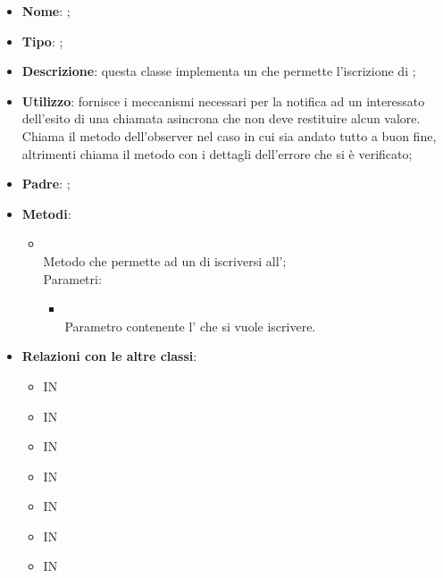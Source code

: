 \begin{itemize}
	\item \textbf{Nome}: ;
	\item \textbf{Tipo}: ;
	\item \textbf{Descrizione}: questa classe implementa un  che permette l'iscrizione di ;
	\item \textbf{Utilizzo}: fornisce i meccanismi necessari per la notifica ad un  interessato dell'esito di una chiamata asincrona che non deve restituire alcun valore. Chiama il metodo  dell'observer nel caso in cui sia andato tutto a buon fine, altrimenti chiama il metodo  con i dettagli dell'errore che si è verificato;
	\item \textbf{Padre}: ;
	\item \textbf{Metodi}:
	\begin{itemize}
		\item[]  \\		Metodo che permette ad un  di iscriversi all';\\
		Parametri:
		\begin{itemize}
			\item {}\\
			Parametro contenente l' che si vuole iscrivere.
		\end{itemize}
	\end{itemize}
	\item \textbf{Relazioni con le altre classi}:
	\begin{itemize}
		\item IN \hyperlink{<<interface>> ConversationsDAO_label}{}
		\item IN \hyperlink{ConversationsDAODynamoDB_label}{}
		\item IN \hyperlink{<<interface>> GuestsDAO_label}{}
		\item IN \hyperlink{GuestsDAODynamoDB_label}{}
		\item IN \hyperlink{<<interface>> MembersDAO_label}{}
		\item IN \hyperlink{MembersDAOSlack_label}{}
		\item IN \hyperlink{<<interface>> RulesDAO_label}{}

\end{itemize}
\end{itemize}
